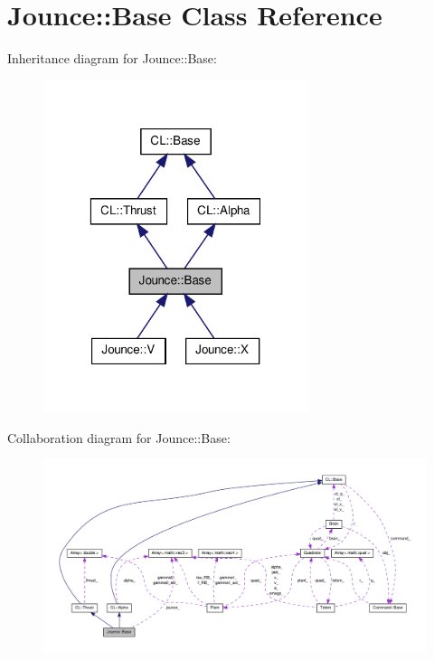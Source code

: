 \hypertarget{classJounce_1_1Base}{\section{\-Jounce\-:\-:\-Base \-Class \-Reference}
\label{classJounce_1_1Base}
}


\-Inheritance diagram for \-Jounce\-:\-:\-Base\-:\nopagebreak
\begin{figure}[H]
\begin{center}
\leavevmode
\includegraphics[width=220pt]{classJounce_1_1Base__inherit__graph}
\end{center}
\end{figure}


\-Collaboration diagram for \-Jounce\-:\-:\-Base\-:\nopagebreak
\begin{figure}[H]
\begin{center}
\leavevmode
\includegraphics[width=350pt]{classJounce_1_1Base__coll__graph}
\end{center}
\end{figure}
